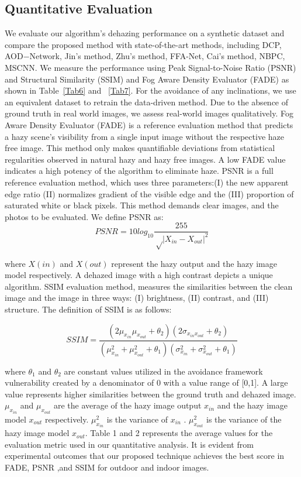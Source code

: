 \documentclass[doctor,english,listoffigures,listoftables]{thesis-uestc}
\begin{document}
\subsection{Quantitative Evaluation}
We evaluate our algorithm's dehazing performance on a synthetic dataset and compare the proposed method with state-of-the-art methods, including DCP, AOD$-$Network, Jin's method, Zhu's method, FFA-Net, Cai's method, NBPC, MSCNN. We measure the performance using  Peak Signal-to-Noise Ratio (PSNR) and Structural Similarity (SSIM) and Fog Aware Density Evaluator (FADE) as shown in Table~\ref{Tab6} and ~\ref{Tab7}. For the avoidance of any inclinations, we use an equivalent dataset to retrain the data-driven method. Due to the absence of ground truth in real world images, we assess real-world images qualitatively. Fog Aware Density Evaluator (FADE) is a reference evaluation method that predicts a hazy scene's visibility from a single input image without the respective haze free image. This method only makes quantifiable deviations from statistical regularities observed in natural hazy and hazy free images. A low FADE value indicates a high potency of the algorithm to eliminate haze. PSNR is a full reference evaluation method, which uses three parameters:(I) the new apparent edge ratio (II) normalizes gradient of the visible edge and the (III) proportion of saturated white or black pixels. This method demands clear images, and the photos to be evaluated. We define PSNR as:
\begin{equation}
	PSNR = 10log_{10} \frac{ 255  }{\sqrt\big| X_{in}-X_{out}\big|^2}
\end{equation}

where $X(in)$ and $X(out)$ represent the hazy output and the hazy image model respectively. A dehazed image with a high contrast depicts a unique algorithm. 
SSIM evaluation method, measures the similarities between the clean image and the image in three ways: (I) brightness, (II) contrast, and (III) structure. The definition of SSIM is as follows:

\begin{equation}
	SSIM= \frac{(2\mu_{ x_{in}}\mu _{x_{out}}+ \theta _2) (2 \sigma _{x_{in} x_{out}}+ \theta _2)}  { ( \mu ^2_{ x_{in}}+ \mu^2_{x_{out}}+ \theta_1)( \sigma^2_{x_{in}} +\sigma^2_{x_{out}} +\theta_1)      }
\end{equation}

where $\theta_1$ and $\theta_2$ are constant values utilized in the avoidance framework vulnerability created by a denominator of 0 with a  value range of [0,1]. A large value represents higher similarities between the ground truth and dehazed image. $\mu_{ x_{in}}$ and $ \mu_{ x_{out}}$ are the average of the hazy image output $ x_{in} $ and the hazy image model $x_{out}$ respectively. $\mu^2_{x_{in}}$ is the variance  of $ x_{in} $ . $ \mu^2_{x_{out}}$ is the variance of the hazy image model $x_{out}$. Table 1 and 2 represents the average values for the evaluation metric used in our quantitative analysis. It is evident from experimental outcomes that our proposed technique achieves the best score in FADE, PSNR ,and SSIM for outdoor and indoor images.
\end{document}
